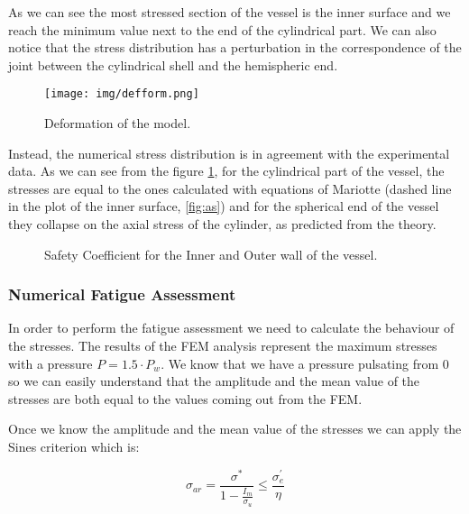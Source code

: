 \documentclass[a4paper,12pt]{article}
\begin{document}
As we can see the most stressed section of the vessel is the inner surface and we reach the minimum value next to the end of the cylindrical part. We can also notice that the stress distribution has a perturbation in the correspondence of the joint between the cylindrical shell and the hemispheric end.\\


\begin{figure}[H]
\centering
\texttt{[image: img/defform.png]}
\caption{Deformation of the model.}
\end{figure}

Instead, the numerical stress distribution  is in agreement with the experimental data. As we can see from the figure \ref{fig:stresses_graph}, for the cylindrical part of the vessel, the stresses are equal to the ones calculated with equations of Mariotte (dashed line in the plot of the inner surface, \ref{fig:as}) and for the spherical end of the vessel they collapse on the axial stress of the cylinder, as predicted from the theory.


\begin{figure}[H]
\centering     %
\caption{Safety Coefficient for the Inner and Outer wall of the vessel.}
\label{fig:stresses_graph}
\end{figure}


\subsubsection*{Numerical Fatigue Assessment}
In order to perform the fatigue assessment we need to calculate the behaviour of the stresses. The results of the FEM analysis represent the maximum stresses with a pressure $P=1.5 \cdot P_w$. We know that we have a pressure pulsating from 0 so we can easily understand that the amplitude and the mean value of the stresses are both equal to the values coming out from the FEM.

Once we know the amplitude and the mean value of the stresses we can apply the Sines criterion which is:

\begin{equation}
\sigma_{ar} = \frac{\sigma^{*}}{1-{\frac{I_m}{\sigma_u}}} \le \frac{\sigma_e^{'}}{\eta}
\end{equation}
\end{document}
